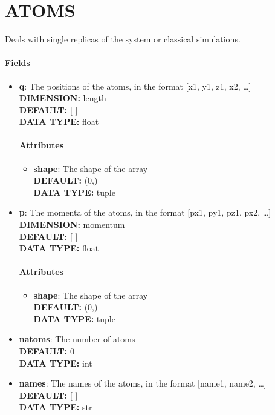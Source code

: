 \section{ATOMS}
\label{ATOMS}
Deals with single replicas of the system or classical simulations.
\paragraph{Fields}
 \begin{itemize}
\item {\bf q}:
 The positions of the atoms, in the format [x1, y1, z1, x2, \ldots  ]
{\\ \bf DIMENSION: }length
{\\ \bf DEFAULT: }[ ]
{\\ \bf DATA TYPE: }float
\paragraph{Attributes}
 \begin{itemize}
\item {\bf shape}:
 The shape of the array
{\\ \bf DEFAULT: }(0,)
{\\ \bf DATA TYPE: }tuple
\end{itemize}
 
\item {\bf p}:
 The momenta of the atoms, in the format [px1, py1, pz1, px2, \ldots  ]
{\\ \bf DIMENSION: }momentum
{\\ \bf DEFAULT: }[ ]
{\\ \bf DATA TYPE: }float
\paragraph{Attributes}
 \begin{itemize}
\item {\bf shape}:
 The shape of the array
{\\ \bf DEFAULT: }(0,)
{\\ \bf DATA TYPE: }tuple
\end{itemize}
 
\item {\bf natoms}:
 The number of atoms
{\\ \bf DEFAULT: }0
{\\ \bf DATA TYPE: }int
\item {\bf names}:
 The names of the atoms, in the format [name1, name2, \ldots  ]
{\\ \bf DEFAULT: }[ ]
{\\ \bf DATA TYPE: }str

\end{itemize}
